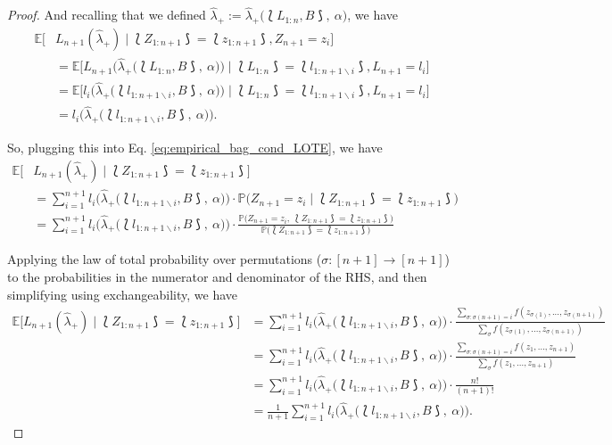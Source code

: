 \begin{proof}
And recalling that we defined $\hat\lambda_+:= \widehat{\lambda}_+\big(\lbag L_{1:n}, B \rbag, \ \alpha\big)$, we have
\begin{align*}
    \mathbb{E}\Big[&L_{n+1}(\hat\lambda_{+}) \mid \lbag Z_{1:n+1} \rbag = \lbag z_{1:n+1} \rbag, Z_{n+1}=z_i\Big]  \\
    & = \mathbb{E}\Big[L_{n+1}\Big(\widehat{\lambda}_+\big(\lbag L_{1:n}, B  \rbag, \ \alpha\big)\Big) \mid \lbag L_{1:n} \rbag = \lbag l_{1:n+1\backslash i} \rbag, L_{n+1}=l_i\Big] \\
    & = \mathbb{E}\Big[l_{i}\Big(\widehat{\lambda}_+\big(\lbag l_{1:n+1\backslash i}, B  \rbag, \ \alpha\big)\Big) \mid \lbag L_{1:n} \rbag = \lbag l_{1:n+1\backslash i} \rbag, L_{n+1}=l_i\Big] \\
    & = l_{i}\Big(\widehat{\lambda}_+\big(\lbag l_{1:n+1\backslash i}, B  \rbag, \ \alpha\big)\Big).
\end{align*}


So, plugging this into Eq. \eqref{eq:empirical_bag_cond_LOTE}, we have
\begin{align*}
    \mathbb{E}\Big[& L_{n+1}(\hat\lambda_{+}) \mid \lbag Z_{1:n+1} \rbag = \lbag z_{1:n+1} \rbag\Big] \\
    & = \sum_{i=1}^{n+1}l_{i}\Big(\widehat{\lambda}_+\big(\lbag l_{1:n+1\backslash i}, B  \rbag, \ \alpha\big)\Big) \cdot \mathbb{P}\big(Z_{n+1}=z_i \mid \lbag Z_{1:n+1} \rbag = \lbag z_{1:n+1} \rbag\big) \\
    & = \sum_{i=1}^{n+1}l_{i}\Big(\widehat{\lambda}_+\big(\lbag l_{1:n+1\backslash i}, B  \rbag, \ \alpha\big)\Big) \cdot\frac{\mathbb{P}\big(Z_{n+1}=z_{i}, \ \lbag Z_{1:n+1} \rbag = \lbag z_{1:n+1} \rbag \big)}{\mathbb{P}\big(\lbag Z_{1:n+1} \rbag = \lbag z_{1:n+1} \rbag\big)}
\end{align*}


Applying the law of total probability over permutations ($\sigma:[n+1]\rightarrow[n+1]$) to the probabilities in the numerator and denominator of the RHS, and then simplifying using exchangeability, we have
\begin{align}\label{eq:gcrc_empirical_risk_bag_conditional}
    \mathbb{E}\big[L_{n+1}(\hat\lambda_{+}) \mid \lbag Z_{1:n+1} \rbag =  \lbag z_{1:n+1} \rbag\big] \nonumber
    & = \sum_{i=1}^{n+1}l_{i}\Big(\widehat{\lambda}_+\big(\lbag l_{1:n+1\backslash i}, B  \rbag, \ \alpha\big)\Big)\cdot \frac{\sum_{\sigma:\sigma(n+1)=i}f(z_{\sigma(1)}, ..., z_{\sigma(n+1)})}{\sum_{\sigma}f(z_{\sigma(1)}, ..., z_{\sigma(n+1)})} \nonumber \\
    & = \sum_{i=1}^{n+1}l_{i}\Big(\widehat{\lambda}_+\big(\lbag l_{1:n+1\backslash i}, B  \rbag, \ \alpha\big)\Big)\cdot \frac{\sum_{\sigma:\sigma(n+1)=i}f(z_1, ..., z_{n+1})}{\sum_{\sigma}f(z_1, ..., z_{n+1})} \nonumber \\
    & = \sum_{i=1}^{n+1}l_{i}\Big(\widehat{\lambda}_+\big(\lbag l_{1:n+1\backslash i}, B  \rbag, \ \alpha\big)\Big)\cdot \frac{n!}{(n+1)!} \nonumber \\
    & = \frac{1}{n+1}\sum_{i=1}^{n+1}l_{i}\Big(\widehat{\lambda}_+\big(\lbag l_{1:n+1\backslash i}, B  \rbag, \ \alpha\big)\Big).
\end{align}


\end{proof}
